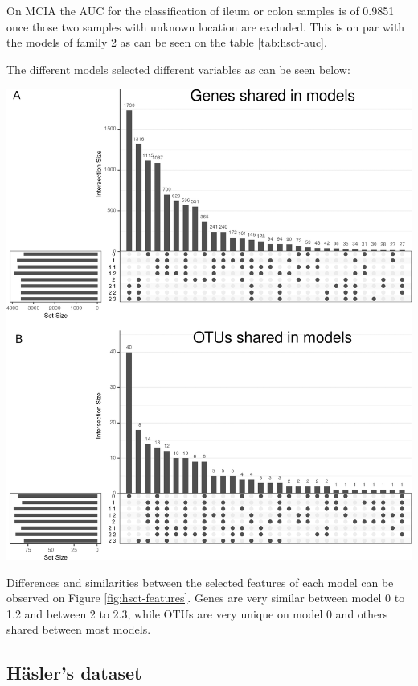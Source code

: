 \documentclass[
  12pt,
  a4paper,
  twoside,
  openright]{book}
\let\origfigure\figure
\let\endorigfigure\endfigure
\renewenvironment{figure}[1][2] {
    \expandafter\origfigure\expandafter[!htp]
} {
    \endorigfigure
}
\begin{document}
On MCIA the AUC for the classification of ileum or colon samples is of 0.9851 once those two samples with unknown location are excluded.
This is on par with the models of family 2 as can be seen on the table \ref{tab:hsct-auc}.

The different models selected different variables as can be seen below:

\begin{figure}
\includegraphics[width=1\linewidth]{images/hsct-features} \caption[Upset plot of variables selected in the HSCT dataset.]{Upset plot of variables selected in the HSCT dataset. The variables selected on each model from 0 to 2.3 showing the intersection between them regarding genes, panel A, and OTUs, panel B.}\label{fig:hsct-features}
\end{figure}

Differences and similarities between the selected features of each model can be observed on Figure \ref{fig:hsct-features}.
Genes are very similar between model 0 to 1.2 and between 2 to 2.3, while OTUs are very unique on model 0 and others shared between most models.

\hypertarget{results-hasler}{%
\subsection{Häsler's dataset}\label{results-hasler}}
\end{document}
